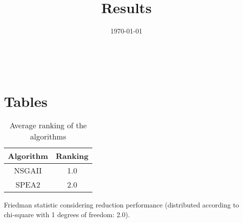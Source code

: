 \documentclass{article}
\title{Results}
\author{}
\date{\today}
\begin{document}
\oddsidemargin 0in \topmargin 0in\maketitle
\
\section{Tables}
\begin{table}[!htp]
\centering
\caption{Average ranking of the algorithms}
\begin{tabular}{c|c}
Algorithm&Ranking\\
\hline
NSGAII&1.0\\
SPEA2&2.0\\
\end{tabular}
\end{table}


Friedman statistic considering reduction performance (distributed according to chi-square with 1 degrees of freedom: 2.0).
\end{document}
